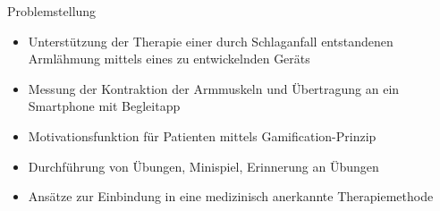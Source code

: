 \documentclass[final,20pt]{beamer}
\newlength{\colwidth}
\begin{document}
\begin{frame}[t]
\begin{columns}[t]
\begin{column}{\colwidth}
	\begin{alertblock}{Problemstellung}
		\begin{itemize}
			\item Unterstützung der Therapie einer durch Schlaganfall entstandenen Armlähmung mittels eines zu entwickelnden Geräts
			\item Messung der Kontraktion der Armmuskeln und Übertragung an ein Smartphone mit Begleitapp
			\item Motivationsfunktion für Patienten mittels Gamification-Prinzip
			\item Durchführung von Übungen, Minispiel, Erinnerung an Übungen
			\item Ansätze zur Einbindung in eine medizinisch anerkannte Therapiemethode
		\end{itemize}
	\end{alertblock}
  

\end{column}
\end{columns}
\end{frame}
\end{document}
